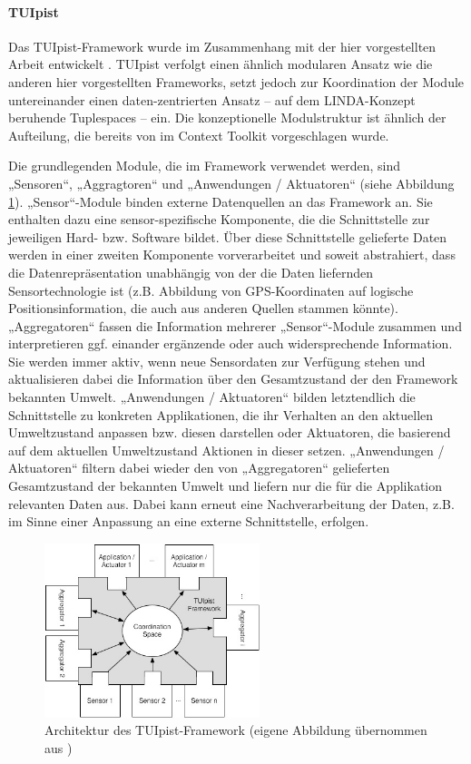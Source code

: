 \paragraph{TUIpist} %
\label{par:tuipist}

Das TUIpist-Framework \citep{Furtmuller07} wurde im Zusammenhang mit der hier vorgestellten Arbeit entwickelt \citep{Furtmuller07a}. TUIpist verfolgt einen ähnlich modularen Ansatz wie die anderen hier vorgestellten Frameworks, setzt jedoch zur Koordination der Module untereinander einen daten-zentrierten Ansatz -- auf dem LINDA-Konzept \citep{Carriero89} beruhende Tuplespaces -- ein. Die konzeptionelle Modulstruktur ist ähnlich der Aufteilung, die bereits von \citet{Dey01} im Context Toolkit vorgeschlagen wurde.

Die grundlegenden Module, die im Framework verwendet werden, sind „Sensoren“, „Aggragtoren“ und „Anwendungen / Aktuatoren“ (siehe Abbildung \ref{fig:img_ImplementierungInput_TUIpist}). „Sensor“-Module binden externe Datenquellen an das Framework an. Sie enthalten dazu eine sensor-spezifische Komponente, die die Schnittstelle zur jeweiligen Hard- bzw. Software bildet. Über diese Schnittstelle gelieferte Daten werden in einer zweiten Komponente vorverarbeitet und soweit abstrahiert, dass die Datenrepräsentation unabhängig von der die Daten liefernden Sensortechnologie ist (z.B. Abbildung von \gls{GPS}-Koordinaten auf logische Positionsinformation, die auch aus anderen Quellen stammen könnte). „Aggregatoren“ fassen die Information mehrerer „Sensor“-Module zusammen und interpretieren ggf. einander ergänzende oder auch widersprechende Information. Sie werden immer aktiv, wenn neue Sensordaten zur Verfügung stehen und aktualisieren dabei die Information über den Gesamtzustand der den Framework bekannten Umwelt. „Anwendungen / Aktuatoren“ bilden letztendlich die Schnittstelle zu konkreten Applikationen, die ihr Verhalten an den aktuellen Umweltzustand anpassen bzw. diesen darstellen oder Aktuatoren, die basierend auf dem aktuellen Umweltzustand Aktionen in dieser setzen. „Anwendungen / Aktuatoren“ filtern dabei wieder den von „Aggregatoren“ gelieferten Gesamtzustand der bekannten Umwelt und liefern nur die für die Applikation relevanten Daten aus. Dabei kann erneut eine Nachverarbeitung der Daten, z.B. im Sinne einer Anpassung an eine externe Schnittstelle, erfolgen.

\begin{figure}[htbp]
	\centering
		\includegraphics[height=2in]{img/ImplementierungInput/TUIpistArchitecture.jpg}
	\caption[Architektur des TUIpist-Framework]{Architektur des TUIpist-Framework (eigene Abbildung übernommen aus \citep{Furtmuller07a})}
	\label{fig:img_ImplementierungInput_TUIpist}
\end{figure}

